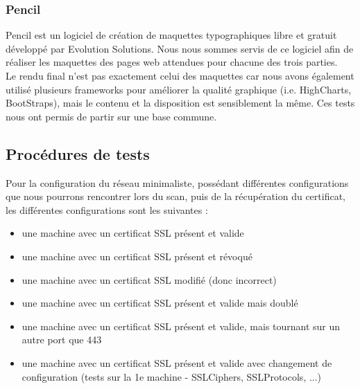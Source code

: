 \subsubsection{Pencil}

Pencil est un logiciel de création de maquettes typographiques libre et gratuit développé par Evolution Solutions.
Nous nous sommes servis de ce logiciel afin de réaliser les maquettes des pages web attendues pour chacune des trois parties.\\
Le rendu final n'est pas exactement celui des maquettes car nous avons également utilisé plusieurs frameworks pour améliorer la qualité graphique (i.e. HighCharts, BootStraps), mais le contenu et la disposition est sensiblement la même.
Ces tests nous ont permis de partir sur une base commune.

\subsection{Procédures de tests}

Pour la configuration du réseau minimaliste, possédant différentes configurations que nous pourrons rencontrer lors du scan, puis de la récupération du certificat, les différentes configurations sont les suivantes :
\begin{itemize}
\item une machine avec un certificat SSL présent et valide
\item une machine avec un certificat SSL présent et révoqué
\item une machine avec un certificat SSL modifié (donc incorrect)
\item une machine avec un certificat SSL présent et valide mais doublé
\item une machine avec un certificat SSL présent et valide, mais tournant sur un autre port que 443
\item une machine avec un certificat SSL présent et valide avec changement de configuration (tests sur la 1e machine - SSLCiphers, SSLProtocols, ...)
\end{itemize}

